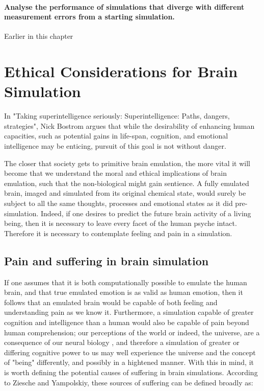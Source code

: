 \subsubsection{Analyse the performance of simulations that diverge with
      different measurement errors from a starting simulation.}

Earlier in this chapter 

\chapter{Ethical Considerations for Brain Simulation}
\setlength{\epigraphwidth}{0.4\textwidth}

In "Taking superintelligence seriously: Superintelligence: Paths, dangers,
strategies", Nick Bostrom argues that while the desirability of enhancing human
capacities, such as potential gains in life-span, cognition, and emotional
intelligence may be enticing, pursuit of this goal is not without danger.
\autocite{bostrom_superintelligence_2014}

The closer that society gets to primitive brain emulation, the more vital it
will become that we understand the moral and ethical implications of brain
emulation, such that the non-biological might gain sentience. A fully emulated
brain, imaged and simulated from its original chemical state, would surely be
subject to all the same thoughts, processes and emotional states as it did
pre-simulation. Indeed, if one desires to predict the future brain activity of a
living being, then it is necessary to leave every facet of the human psyche
intact. Therefore it is necessary to contemplate feeling and pain in a simulation.

\section{Pain and suffering in brain simulation}

If one assumes that it is both computationally possible to emulate the human
brain, and that true emulated emotion is as valid as human emotion,
then it follows that an emulated brain would be capable of both feeling and
understanding pain as we know it. Furthermore, a simulation capable of greater
cognition and intelligence than a human would also be capable of pain beyond
human comprehension; our perceptions of the world or indeed, the universe, are a
consequence of our neural biology \autocite{eagleman_human_2008}, and therefore
a simulation of greater or differing cognitive power to us may well experience
the universe and the concept of "being" differently, and possibly in a hightened
manner. With this in mind, it is worth defining the potential
causes of suffering in brain simulations. According to Ziesche and Yampolskiy,
these sources of suffering can be defined broadly as:

